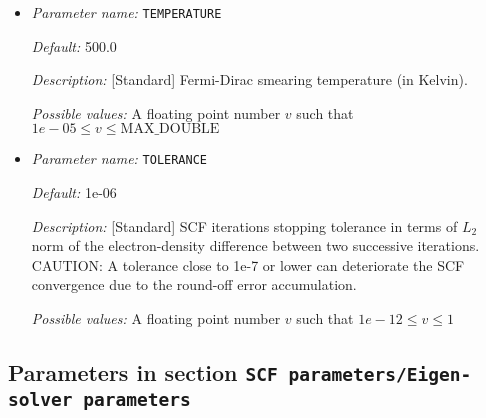 \begin{itemize}


{\it Default:} RANDOM


{\it Description:} [Standard] Sets the type of the starting Kohn-Sham wavefunctions guess: Atomic(Superposition of single atom atomic orbitals. Atom types for which atomic orbitals are not available, random wavefunctions are taken. Currently, atomic orbitals data is not available for all atoms.), Random(The starting guess for all wavefunctions are taken to be random). Default: RANDOM.


{\it Possible values:} Any one of ATOMIC, RANDOM
\item {\it Parameter name:} {\tt TEMPERATURE}
\label{parameters:SCF parameters/TEMPERATURE}
\label{parameters:SCF_20parameters/TEMPERATURE}




{\it Default:} 500.0


{\it Description:} [Standard] Fermi-Dirac smearing temperature (in Kelvin).


{\it Possible values:} A floating point number $v$ such that $1e-05 \leq v \leq \text{MAX\_DOUBLE}$
\item {\it Parameter name:} {\tt TOLERANCE}
\label{parameters:SCF parameters/TOLERANCE}
\label{parameters:SCF_20parameters/TOLERANCE}




{\it Default:} 1e-06


{\it Description:} [Standard] SCF iterations stopping tolerance in terms of $L_2$ norm of the electron-density difference between two successive iterations. CAUTION: A tolerance close to 1e-7 or lower can deteriorate the SCF convergence due to the round-off error accumulation.


{\it Possible values:} A floating point number $v$ such that $1e-12 \leq v \leq 1$
\end{itemize}



\subsection{Parameters in section \tt SCF parameters/Eigen-solver parameters}
\label{parameters:SCF_20parameters/Eigen_2dsolver_20parameters}

